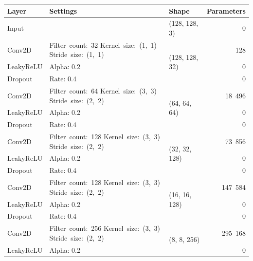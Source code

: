 \begin{table}
    \begin{center}
        \begin{tabular}{ |m{5em}|m{9em}|l|r| }
            \hline
                Layer & Settings & Shape & \multicolumn{1}{l|}{Parameters} \\
            \hline
            \hline
                Input & & (128, 128, 3) & 0 \\
            \hline
                Conv2D & \mbox{Filter count: 32} \mbox{Kernel size: (1, 1)} \mbox{Stride size: (1, 1)} & \multirow{3}{6em}{(128, 128, 32)} & 128 \\
            \cline{1-2} \cline{4-4}
                LeakyReLU & Alpha: 0.2 & & 0 \\
            \cline{1-2} \cline{4-4}
                Dropout & Rate: 0.4 & & 0 \\
            \hline
                Conv2D & \mbox{Filter count: 64} \mbox{Kernel size: (3, 3)} \mbox{Stride size: (2, 2)} & \multirow{3}{6em}{(64, 64, 64)} & 18~496 \\
            \cline{1-2} \cline{4-4}
                LeakyReLU & Alpha: 0.2 & & 0 \\
            \cline{1-2} \cline{4-4}
                Dropout & Rate: 0.4 & & 0 \\
            \hline
                Conv2D & \mbox{Filter count: 128} \mbox{Kernel size: (3, 3)} \mbox{Stride size: (2, 2)} & \multirow{3}{6em}{(32, 32, 128)} & 73~856 \\
            \cline{1-2} \cline{4-4}
                LeakyReLU & Alpha: 0.2 & & 0 \\
            \cline{1-2} \cline{4-4}
                Dropout & Rate: 0.4 & & 0 \\
            \hline
                Conv2D & \mbox{Filter count: 128} \mbox{Kernel size: (3, 3)} \mbox{Stride size: (2, 2)} & \multirow{3}{6em}{(16, 16, 128)} & 147~584 \\
            \cline{1-2} \cline{4-4}
                LeakyReLU & Alpha: 0.2 & & 0 \\
            \cline{1-2} \cline{4-4}
                Dropout & Rate: 0.4 & & 0 \\
            \hline
                Conv2D & \mbox{Filter count: 256} \mbox{Kernel size: (3, 3)} \mbox{Stride size: (2, 2)} & \multirow{3}{6em}{(8, 8, 256)} & 295~168 \\
            \cline{1-2} \cline{4-4}
                LeakyReLU & Alpha: 0.2 & & 0 \\

\end{tabular}
\end{center}
\end{table}
